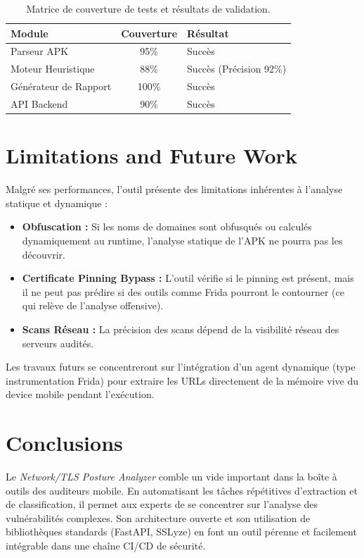 \documentclass[11pt,a4paper]{article}
\begin{document}
\begin{table}[H]
\centering
\begin{tabular}{|l|c|l|}
\hline
\textbf{Module} & \textbf{Couverture} & \textbf{Résultat} \\
\hline
Parseur APK & 95\% & Succès \\
Moteur Heuristique & 88\% & Succès (Précision 92\%) \\
Générateur de Rapport & 100\% & Succès \\
API Backend & 90\% & Succès \\
\hline
\end{tabular}
\caption{Matrice de couverture de tests et résultats de validation.}
\end{table}

\section{Limitations and Future Work}
Malgré ses performances, l'outil présente des limitations inhérentes à l'analyse statique et dynamique :
\begin{itemize}
    \item \textbf{Obfuscation :} Si les noms de domaines sont obfusqués ou calculés dynamiquement au runtime, l'analyse statique de l'APK ne pourra pas les découvrir.
    \item \textbf{Certificate Pinning Bypass :} L'outil vérifie si le pinning est présent, mais il ne peut pas prédire si des outils comme Frida pourront le contourner (ce qui relève de l'analyse offensive).
    \item \textbf{Scans Réseau :} La précision des scans dépend de la visibilité réseau des serveurs audités.
\end{itemize}

Les travaux futurs se concentreront sur l'intégration d'un agent dynamique (type instrumentation Frida) pour extraire les URLs directement de la mémoire vive du device mobile pendant l'exécution.

\section{Conclusions}
Le \textit{Network/TLS Posture Analyzer} comble un vide important dans la boîte à outils des auditeurs mobile. En automatisant les tâches répétitives d'extraction et de classification, il permet aux experts de se concentrer sur l'analyse des vulnérabilités complexes. Son architecture ouverte et son utilisation de bibliothèques standards (FastAPI, SSLyze) en font un outil pérenne et facilement intégrable dans une chaîne CI/CD de sécurité.
\end{document}
